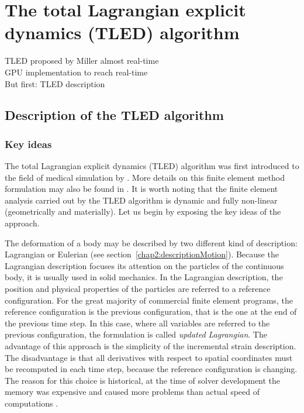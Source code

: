 \chapter{The total Lagrangian explicit dynamics (TLED) algorithm}
\label{chap5}
\begin{shortAbstract}
TLED proposed by Miller almost real-time \\
GPU implementation to reach real-time \\
But first: TLED description \\
\end{shortAbstract}


\section{Description of the TLED algorithm}

	\subsection{Key ideas}

The total Lagrangian explicit dynamics (TLED) algorithm was first introduced to the field of medical simulation by \cite{Miller07}. More details on this finite element method formulation may also be found in \cite{Bathe95}. It is worth noting that the finite element analysis carried out by the TLED algorithm is dynamic and fully non-linear (geometrically and materially). Let us begin by exposing the key ideas of the approach. 

The deformation of a body may be described by two different kind of description: Lagrangian or Eulerian (see section~\ref{chap2:descriptionMotion}). Because the Lagrangian description focuses its attention on the particles of the continuous body, it is usually used in solid mechanics. In the Lagrangian description, the position and physical properties of the particles are referred to a reference configuration. For the great majority of commercial finite element programs, the reference configuration is the previous configuration, that is the one at the end of the previous time step. In this case, where all variables are referred to the previous configuration, the formulation is called \emph{updated Lagrangian}. The advantage of this approach is the simplicity of the incremental strain description. The disadvantage is that all derivatives with respect to spatial coordinates must be recomputed in each time step, because the reference configuration is changing. The reason for this choice is historical, at the time of solver development the memory was expensive and caused more problems than actual speed of computations \citep{Miller07}. 

